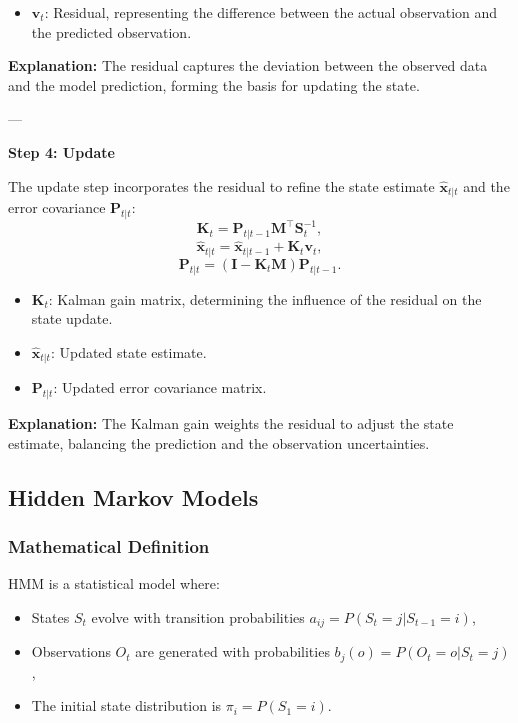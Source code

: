 \documentclass[12pt,a4paper]{article}
\begin{document}
\begin{itemize}
    \item \( \mathbf{v}_t \): Residual, representing the difference between the actual observation and the predicted observation.
\end{itemize}

\textbf{Explanation:} The residual captures the deviation between the observed data and the model prediction, forming the basis for updating the state.

---

\textbf{Step 4: Update}

The update step incorporates the residual to refine the state estimate \( \hat{\mathbf{x}}_{t|t} \) and the error covariance \( \mathbf{P}_{t|t} \):
\[
\mathbf{K}_t = \mathbf{P}_{t|t-1} \mathbf{M}^\top \mathbf{S}_t^{-1},
\]
\[
\hat{\mathbf{x}}_{t|t} = \hat{\mathbf{x}}_{t|t-1} + \mathbf{K}_t \mathbf{v}_t,
\]
\[
\mathbf{P}_{t|t} = (\mathbf{I} - \mathbf{K}_t \mathbf{M}) \mathbf{P}_{t|t-1}.
\]

\begin{itemize}
    \item \( \mathbf{K}_t \): Kalman gain matrix, determining the influence of the residual on the state update.
    \item \( \hat{\mathbf{x}}_{t|t} \): Updated state estimate.
    \item \( \mathbf{P}_{t|t} \): Updated error covariance matrix.
\end{itemize}

\textbf{Explanation:} The Kalman gain weights the residual to adjust the state estimate, balancing the prediction and the observation uncertainties.


\subsection{Hidden Markov Models}

\subsubsection{Mathematical Definition}
HMM is a statistical model where:
\begin{itemize}
    \item States \( S_t \) evolve with transition probabilities \( a_{ij} = P(S_t = j | S_{t-1} = i) \),
    \item Observations \( O_t \) are generated with probabilities \( b_j(o) = P(O_t = o | S_t = j) \),
    \item The initial state distribution is \( \pi_i = P(S_1 = i) \).
\end{itemize}
\end{document}

